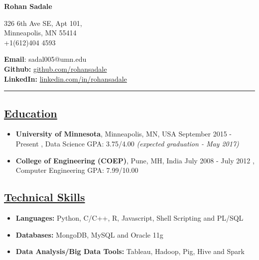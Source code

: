\documentclass[10pt]{article}
\begin{document}

\hspace{2in} {{\bfseries {\huge Rohan Sadale}}}
\vspace{10pt}

\noindent \begin{minipage}[b]{0.3\hsize}
326 6th Ave SE, Apt 101,  \\
Minneapolis, MN 55414 \\
+1(612)404 4593
\end{minipage}
\hfill
\begin{minipage}[b]{0.40\hsize}
{\bfseries {\normalsize Email}}: {\normalsize sadal005@umn.edu} \\
{\bfseries Github:} \normalsize \url{github.com/rohansadale} \\
{\bfseries {\normalsize LinkedIn:}} \normalsize \url{linkedin.com/in/rohansadale}
\end{minipage}

\vspace{4pt}

\hrule
\vspace{-0.2cm}
\subsection*{\underline{Education}}
\vspace{-0.1cm}
\begin{itemize}[leftmargin=*]
\item[] {\bfseries University of Minnesota}, Minneapolis, MN, USA \hfill September 2015 - Present
, Data Science \hspace{0.2in} GPA: 3.75/4.00  \hfill {\sl (expected graduation - May 2017)}
\vspace{-0.1cm}
\item[] {\bfseries College of Engineering (COEP)}, Pune, MH, India \hfill July 2008 - July 2012  
, Computer Engineering	 \hspace{0.2in} GPA: 7.99/10.00
\end{itemize}

\subsection*{\underline{Technical Skills}}
\vspace{-0.1cm}
\begin{itemize}[leftmargin=*]
 \item[]  \textbf{Languages:}  Python, C/C++, R, Javascript, Shell Scripting and PL/SQL
 \vspace{-0.25cm}
 \item[]   \textbf{Databases:}  MongoDB, MySQL and Oracle 11g
  \vspace{-0.25cm}
 \item[]   \textbf{Data Analysis/Big Data Tools:} Tableau, Hadoop, Pig, Hive and Spark
\end{itemize}
\end{document}
